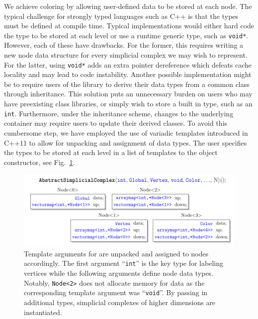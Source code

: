 	\par We achieve coloring by allowing user-defined data to be stored at each node.
	The typical challenge for strongly typed languages such as C++ is that the types must be defined at compile time.
	Typical implementations would either hard code the type to be stored at each level or use a runtime generic type, such as \verb|void*|.
	However, each of these have drawbacks. For the former, this requires writing a new node data structure for every simplicial complex we may wish to represent.
	For the latter, using \verb|void*| adds an extra pointer dereference which defeats cache locality and may lead to code instability.
	Another possible implementation might be to require users of the library to derive their data types from a common class through inheritance.
	This solution puts an unnecessary burden on users who may have preexisting class libraries, or simply wish to store a built in type, such as an \verb|int|.
	Furthermore, under the inheritance scheme, changes to the underlying container may require users to update their derived classes.
	To avoid this cumbersome step, we have employed the use of variadic templates introduced in C++11 to allow for unpacking and assignment of data types.
	The user specifies the types to be stored at each level in a list of templates to the object constructor, see Fig.~\ref{fig:unpacking}.

\begin{figure}[ht!]
	\centering
	\includegraphics[width=\textwidth]{Figures/unpacking/unpacking}
	\caption[Unpacking of template arguments for \asc]{
		Template arguments for \asc are unpacked and assigned to nodes accordingly. The first argument ``\texttt{int}'' is the key type for labeling vertices while the following arguments define node data types. Notably, \texttt{Node<2>} does not allocate memory for data as the corresponding template argument was ``\texttt{void}''. By passing in additional types, simplicial complexes of higher dimensions are instantiated.
	}
	\label{fig:unpacking}
\end{figure}

